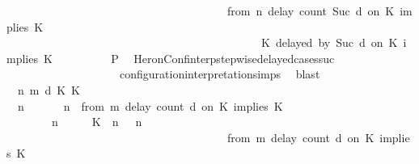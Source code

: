 \begin{isabellebody}
\ \ \ \ \ \ \ \ \ \ \ \ \ \ \ \ \ \ \ \ \ \ \ \ \ \ \ \ \ \ \ \ \ \ \ \ {\isasymturnstile}\ {\isasymPsi}\ {\isasymtriangleright}\ {\isacharparenleft}{\isacharparenleft}from\ n\ delay\ count\ Suc\ d\ on\ K\ implies\ K\isanewline
\ \ \ \ \ \ \ \ \ \ \ \ \ \ \ \ \ \ \ \ \ \ \ \ \ \ \ \ \ \ \ \ \ \ \ \ \ \ \ \ \ \ \ \ {\isacharhash}\ {\isacharparenleft}K\ delayed\ by\ Suc\ d\ on\ K\ implies\ K\ {\isacharhash}\ {\isasymPhi}{\isacharparenright}{\isacharparenright}{\isacartoucheclose}\isanewline
\ \ \ \ \ \ \isamarkupfalse%
\ {\isacharquery}P\ \isamarkupfalse%
\ HeronConf{\isacharunderscore}interp{\isacharunderscore}stepwise{\isacharunderscore}delayed{\isacharunderscore}cases{\isacharunderscore}suc\isanewline
\ \ \ \ \ \ \ \ \ \ \ \ \ \ \ \ \ \ \ \ configuration{\isacharunderscore}interpretation{\isachardot}simps\ \isamarkupfalse%
\ blast\isanewline
\ \ \ \ \isamarkupfalse%
\isanewline
\ \ \ \ \ \ \isamarkupfalse%
\ {\isasymGamma}\ n\ m\ d\ K\ K\ {\isasymPsi}\ {\isasymPhi}\isanewline
\ \ \ \ \ \ \isamarkupfalse%
\ {\isacartoucheopen}{\isacharparenleft}{\isasymGamma}\ n\ {\isasymturnstile}\ {\isasymPsi}\ {\isasymtriangleright}\ {\isasymPhi}\ {\isacharequal}\ {\isacharparenleft}{\isasymGamma}{\isacharcomma}\ n\ {\isasymturnstile}\ {\isacharparenleft}from\ m\ delay\ count\ d\ on\ K\ implies\ K\ {\isacharhash}\ {\isasymPsi}\ {\isasymtriangleright}\ {\isasymPhi}{\isacharparenright}{\isacartoucheclose}\isanewline
\ \ \ \ \ \ \ {\isacartoucheopen}{\isacharparenleft}{\isasymGamma}\ n\ {\isasymturnstile}\ {\isasymPsi}\ {\isasymtriangleright}\ {\isasymPhi}\ {\isacharequal}\ {\isacharparenleft}{\isacharparenleft}{\isacharparenleft}K\ {\isasymnot}{\isasymUp}\ n{\isacharparenright}\ {\isacharhash}\ {\isasymGamma}{\isacharparenright}{\isacharcomma}\ n\isanewline
\ \ \ \ \ \ \ \ \ \ \ \ \ \ \ \ \ \ \ \ \ \ \ \ \ \ \ \ \ \ \ \ \ \ \ \ {\isasymturnstile}\ {\isasymPsi}\ {\isasymtriangleright}\ {\isacharparenleft}{\isacharparenleft}from\ m\ delay\ count\ d\ on\ K\ implies\ K\ {\isacharhash}\ {\isasymPhi}{\isacharparenright}{\isacharparenright}{\isacartoucheclose}\isanewline

\end{isabellebody}
